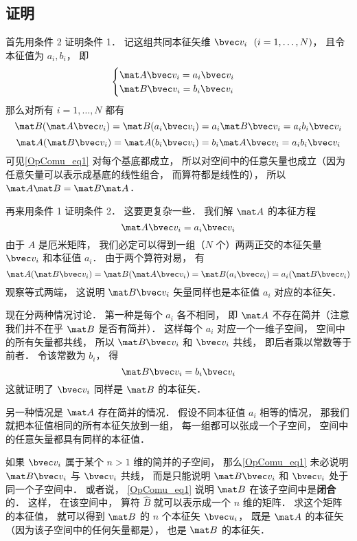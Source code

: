 \subsection{证明}
首先用条件 2 证明条件 1． 记这组共同本征矢维 $\bvec v_i \ \ (i = 1, \dots , N)$， 且令本征值为 $a_i, b_i$， 即
\begin{equation}
\begin{cases}
\mat A \bvec v_i = a_i \bvec v_i\\
\mat B \bvec v_i = b_i \bvec v_i
\end{cases}
\end{equation}
那么对所有 $i = 1, \dots, N$ 都有
\begin{equation}
\mat B (\mat A \bvec v_i) = \mat B (a_i \bvec v_i) = a_i \mat B \bvec v_i = a_i b_i \bvec v_i
\end{equation}
\begin{equation}
\mat A (\mat B \bvec v_i) = \mat A (b_i \bvec v_i) = b_i \mat A \bvec v_i = a_i b_i \bvec v_i
\end{equation}
可见\autoref{OpComu_eq1} 对每个基底都成立， 所以对空间中的任意矢量也成立（因为任意矢量可以表示成基底的线性组合， 而算符都是线性的）， 所以 $\mat A \mat B = \mat B \mat A$．

再来用条件 1 证明条件 2． 这要更复杂一些． 我们解 $\mat A$ 的本征方程
\begin{equation}
\mat A \bvec v_i = a_i \bvec v_i
\end{equation}
由于 $A$ 是厄米矩阵， 我们必定可以得到一组（$N$ 个）两两正交的本征矢量 $\bvec v_i$ 和本征值 $a_i$． 由于两个算符对易， 有
\begin{equation}
\mat A (\mat B \bvec v_i) = \mat B (\mat A \bvec v_i) = \mat B (a_i \bvec v_i) = a_i (\mat B \bvec v_i)
\end{equation}
观察等式两端， 这说明 $\mat B \bvec v_i$ 矢量同样也是本征值 $a_i$ 对应的本征矢．

现在分两种情况讨论． 第一种是每个 $a_i$ 各不相同， 即 $\mat A$ 不存在简并（注意我们并不在乎 $\mat B$ 是否有简并）． 这样每个 $a_i$ 对应一个一维子空间， 空间中的所有矢量都共线， 所以 $\mat B \bvec v_i$ 和 $\bvec v_i$ 共线， 即后者乘以常数等于前者． 令该常数为 $b_i$， 得
\begin{equation}
\mat B \bvec v_i = b_i \bvec v_i
\end{equation}
这就证明了 $\bvec v_i$ 同样是 $\mat B$ 的本征矢．

另一种情况是 $\mat A$ 存在简并的情况． 假设不同本征值 $a_i$ 相等的情况， 那我们就把本征值相同的所有本征矢放到一组， 每一组都可以张成一个子空间， 空间中的任意矢量都具有同样的本征值．

如果 $\bvec v_i$ 属于某个 $n > 1$ 维的简并的子空间， 那么\autoref{OpComu_eq1} 未必说明 $\mat B \bvec v_i$ 与 $\bvec v_i$ 共线， 而是只能说明 $\mat B \bvec v_i$ 和 $\bvec v_i$ 处于同一个子空间中． 或者说， \autoref{OpComu_eq1} 说明 $\mat B$ 在该子空间中是\textbf{闭合}的． 这样， 在该空间中， 算符 $\hat B$ 就可以表示成一个 $n$ 维的矩阵． 求这个矩阵的本征值， 就可以得到 $\mat B$ 的 $n$ 个本征矢 $\bvec u_i$， 既是 $\mat A$ 的本征矢（因为该子空间中的任何矢量都是）， 也是 $\mat B$ 的本征矢．

